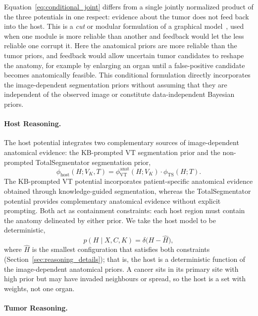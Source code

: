 \documentclass[fleqn,10pt]{olplainarticle}
\begin{document}
Equation~\eqref{eq:conditional_joint} differs from a
single jointly normalized product of the three
potentials in one respect: evidence about the tumor
does not feed back into the host. This is a
\emph{cut} or modular formulation of a
graphical model~\cite{liu2009modularization,plummer2015cuts,jacob2017better},
used when one module is more reliable than another
and feedback would let the less reliable one corrupt
it. Here the anatomical priors are more reliable than
the tumor priors, and feedback would allow uncertain
tumor candidates to reshape the anatomy, for example
by enlarging an organ until a false-positive candidate
becomes anatomically feasible.
This conditional formulation directly
incorporates the image-dependent segmentation
priors without assuming that they are
independent of the observed image or
constitute data-independent Bayesian priors.

\paragraph{Host Reasoning.}

The host potential integrates
two complementary sources of image-dependent
anatomical evidence: the KB-prompted VT
segmentation prior and the non-prompted
TotalSegmentator segmentation prior,
\begin{equation}
\label{eq:host_reasoning}
\phi_{\mathrm{host}}(H;V_K,T)
=\phi_{\mathrm{VT}}^{\mathrm{anat}}(H;V_K)\cdot
\phi_{\mathrm{TS}}(H;T).
\end{equation}
The KB-prompted VT potential incorporates
patient-specific anatomical evidence
obtained through knowledge-guided
segmentation, whereas the TotalSegmentator
potential provides complementary anatomical
evidence without explicit prompting.
Both act as containment constraints: each host
region must contain the anatomy delineated by either
prior. We take the host model to be deterministic,
\begin{equation}
\label{eq:host_point_mass}
p(H\mid X,C,K)=\delta\bigl(H-\hat H\bigr),
\end{equation}
where $\hat H$ is the smallest configuration that
satisfies both constraints
(Section~\ref{sec:reasoning_details}); that is, the host
is a deterministic function of the image-dependent
anatomical priors.
A cancer sits in its primary site with high prior but may have invaded neighbours or spread, so the host is a set with weights, not one organ.

\paragraph{Tumor Reasoning.}
\end{document}
